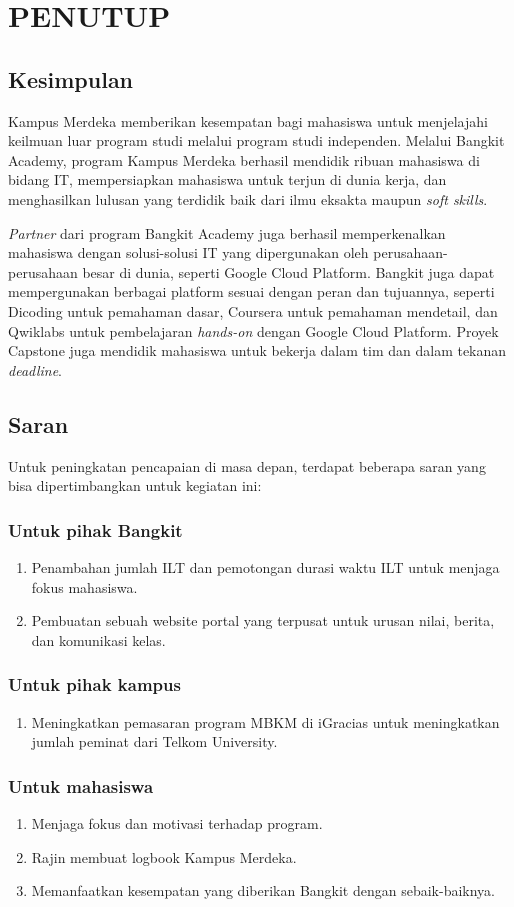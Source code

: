 \chapter{PENUTUP}
\section{Kesimpulan}
Kampus Merdeka memberikan kesempatan bagi mahasiswa untuk menjelajahi keilmuan luar program studi melalui program studi independen. Melalui Bangkit Academy, program Kampus Merdeka berhasil mendidik ribuan mahasiswa di bidang IT, mempersiapkan mahasiswa untuk terjun di dunia kerja, dan menghasilkan lulusan yang terdidik baik dari ilmu eksakta maupun \textit{soft skills}.

\textit{Partner} dari program Bangkit Academy juga berhasil memperkenalkan mahasiswa dengan solusi-solusi IT yang dipergunakan oleh perusahaan-perusahaan besar di dunia, seperti Google Cloud Platform. Bangkit juga dapat mempergunakan berbagai platform sesuai dengan peran dan tujuannya, seperti Dicoding untuk pemahaman dasar, Coursera untuk pemahaman mendetail, dan Qwiklabs untuk pembelajaran \textit{hands-on} dengan Google Cloud Platform. Proyek Capstone juga mendidik mahasiswa untuk bekerja dalam tim dan dalam tekanan \textit{deadline}.
\section{Saran}
Untuk peningkatan pencapaian di masa depan, terdapat beberapa saran yang bisa dipertimbangkan untuk kegiatan ini:
\subsection{Untuk pihak Bangkit}
\begin{enumerate}
	\item Penambahan jumlah ILT dan pemotongan durasi waktu ILT untuk menjaga fokus mahasiswa.
	\item Pembuatan sebuah website portal yang terpusat untuk urusan nilai, berita, dan komunikasi kelas.
\end{enumerate}
\subsection{Untuk pihak kampus}
\begin{enumerate}
	\item Meningkatkan pemasaran program MBKM di iGracias untuk meningkatkan jumlah peminat dari Telkom University.
\end{enumerate}
\subsection{Untuk mahasiswa}
\begin{enumerate}
	\item Menjaga fokus dan motivasi terhadap program.
	\item Rajin membuat logbook Kampus Merdeka.
	\item Memanfaatkan kesempatan yang diberikan Bangkit dengan sebaik-baiknya.
\end{enumerate}